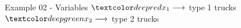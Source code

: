 \begin{frame}{Example 02 - Variables}
\Huge{
$\colora{{x}_{1}} \longrightarrow$
    type 1 trucks \\ \vspace{1cm}
$\colorb{{x}_{2}} \longrightarrow$
    type 2 trucks
}
\end{frame}
